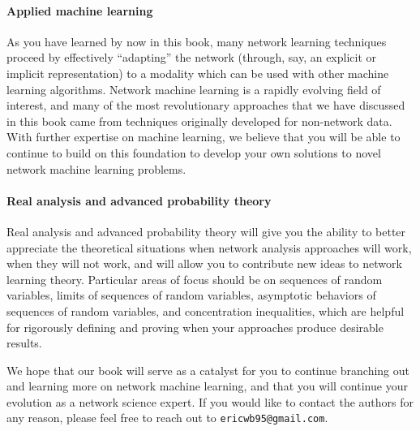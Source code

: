 \paragraph{Applied machine learning}

As you have learned by now in this book, many network learning techniques proceed by effectively ``adapting'' the network (through, say, an explicit or implicit representation) to a modality which can be used with other machine learning algorithms. Network machine learning is a rapidly evolving field of interest, and many of the most revolutionary approaches that we have discussed in this book came from techniques originally developed for non-network data. With further expertise on machine learning, we believe that you will be able to continue to build on this foundation to develop your own solutions to novel network machine learning problems. 


\paragraph{Real analysis and advanced probability theory}

Real analysis and advanced probability theory will give you the ability to better appreciate the theoretical situations when network analysis approaches will work, when they will not work, and will allow you to contribute new ideas to network learning theory. Particular areas of focus should be on sequences of random variables, limits of sequences of random variables, asymptotic behaviors of sequences of random variables, and concentration inequalities, which are helpful for rigorously defining and proving when your approaches produce desirable results. 

We hope that our book will serve as a catalyst for you to continue branching out and learning more on network machine learning, and that you will continue your evolution as a network science expert. If you would like to contact the authors for any reason, please feel free to reach out to \texttt{ericwb95@gmail.com}.